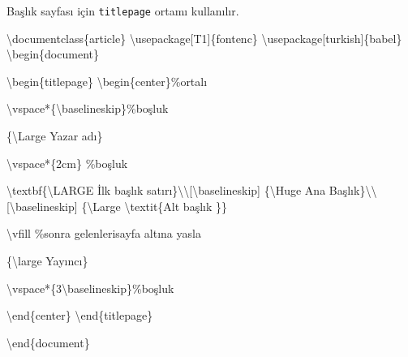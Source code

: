 \documentclass[
  letterpaper,
  DIV=11,
  numbers=noendperiod]{scrreprt}
\newenvironment{Shaded}{\begin{snugshade}}{\end{snugshade}}
\newcommand{\BuiltInTok}[1]{\textcolor[rgb]{0.00,0.23,0.31}{#1}}
\newcommand{\CommentTok}[1]{\textcolor[rgb]{0.37,0.37,0.37}{#1}}
\newcommand{\ExtensionTok}[1]{\textcolor[rgb]{0.00,0.23,0.31}{#1}}
\newcommand{\FunctionTok}[1]{\textcolor[rgb]{0.28,0.35,0.67}{#1}}
\newcommand{\KeywordTok}[1]{\textcolor[rgb]{0.00,0.23,0.31}{#1}}
\newcommand{\NormalTok}[1]{\textcolor[rgb]{0.00,0.23,0.31}{#1}}
\begin{document}
Başlık sayfası için \texttt{titlepage} ortamı kullanılır.

\begin{Shaded}
\begin{Highlighting}[]
\BuiltInTok{\textbackslash{}documentclass}\NormalTok{\{}\ExtensionTok{article}\NormalTok{\}}
\BuiltInTok{\textbackslash{}usepackage}\NormalTok{[T1]\{}\ExtensionTok{fontenc}\NormalTok{\}}
\BuiltInTok{\textbackslash{}usepackage}\NormalTok{[turkish]\{}\ExtensionTok{babel}\NormalTok{\}}
\KeywordTok{\textbackslash{}begin}\NormalTok{\{}\ExtensionTok{document}\NormalTok{\}}

\KeywordTok{\textbackslash{}begin}\NormalTok{\{}\ExtensionTok{titlepage}\NormalTok{\}}
  \KeywordTok{\textbackslash{}begin}\NormalTok{\{}\ExtensionTok{center}\NormalTok{\}}\CommentTok{\%ortalı}

  \FunctionTok{\textbackslash{}vspace*}\NormalTok{\{}\FunctionTok{\textbackslash{}baselineskip}\NormalTok{\}}\CommentTok{\%boşluk}

\NormalTok{  \{}\FunctionTok{\textbackslash{}Large}\NormalTok{ Yazar adı\}}

  \FunctionTok{\textbackslash{}vspace*}\NormalTok{\{2cm\} }\CommentTok{\%boşluk}

  \FunctionTok{\textbackslash{}textbf}\NormalTok{\{}\FunctionTok{\textbackslash{}LARGE}\NormalTok{ İlk başlık satırı\}}\FunctionTok{\textbackslash{}\textbackslash{}}\NormalTok{[}\FunctionTok{\textbackslash{}baselineskip}\NormalTok{]}
\NormalTok{  \{}\FunctionTok{\textbackslash{}Huge}\NormalTok{ Ana Başlık\}}\FunctionTok{\textbackslash{}\textbackslash{}}\NormalTok{[}\FunctionTok{\textbackslash{}baselineskip}\NormalTok{]}
\NormalTok{  \{}\FunctionTok{\textbackslash{}Large} \FunctionTok{\textbackslash{}textit}\NormalTok{\{Alt başlık \}\}}

  \FunctionTok{\textbackslash{}vfill} \CommentTok{\%sonra gelenlerisayfa altına yasla}

\NormalTok{  \{}\FunctionTok{\textbackslash{}large}\NormalTok{ Yayıncı\}}

  \FunctionTok{\textbackslash{}vspace*}\NormalTok{\{3}\FunctionTok{\textbackslash{}baselineskip}\NormalTok{\}}\CommentTok{\%boşluk}

  \KeywordTok{\textbackslash{}end}\NormalTok{\{}\ExtensionTok{center}\NormalTok{\}}
\KeywordTok{\textbackslash{}end}\NormalTok{\{}\ExtensionTok{titlepage}\NormalTok{\}}

\KeywordTok{\textbackslash{}end}\NormalTok{\{}\ExtensionTok{document}\NormalTok{\}}
\end{Highlighting}
\end{Shaded}
\end{document}
